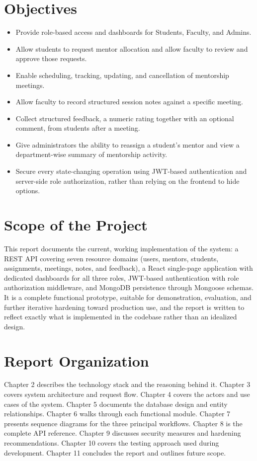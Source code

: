 \documentclass[12pt,a4paper]{report}
\newcommand{\sectionrule}{\vspace{-4pt}{\color{lightgray}\hrule height 1pt}\vspace{8pt}}
\begin{document}
\section{Objectives}
\sectionrule
\begin{itemize}[itemsep=2pt]
  \item Provide role-based access and dashboards for Students, Faculty, and Admins.
  \item Allow students to request mentor allocation and allow faculty to review and approve those requests.
  \item Enable scheduling, tracking, updating, and cancellation of mentorship meetings.
  \item Allow faculty to record structured session notes against a specific meeting.
  \item Collect structured feedback, a numeric rating together with an optional comment, from students after a meeting.
  \item Give administrators the ability to reassign a student's mentor and view a department-wise summary of mentorship activity.
  \item Secure every state-changing operation using JWT-based authentication and server-side role authorization, rather than relying on the frontend to hide options.
\end{itemize}

\section{Scope of the Project}
\sectionrule
This report documents the current, working implementation of the system: a REST API covering seven resource domains (users, mentors, students, assignments, meetings, notes, and feedback), a React single-page application with dedicated dashboards for all three roles, JWT-based authentication with role authorization middleware, and MongoDB persistence through Mongoose schemas. It is a complete functional prototype, suitable for demonstration, evaluation, and further iterative hardening toward production use, and the report is written to reflect exactly what is implemented in the codebase rather than an idealized design.

\section{Report Organization}
\sectionrule
Chapter 2 describes the technology stack and the reasoning behind it. Chapter 3 covers system architecture and request flow. Chapter 4 covers the actors and use cases of the system. Chapter 5 documents the database design and entity relationships. Chapter 6 walks through each functional module. Chapter 7 presents sequence diagrams for the three principal workflows. Chapter 8 is the complete API reference. Chapter 9 discusses security measures and hardening recommendations. Chapter 10 covers the testing approach used during development. Chapter 11 concludes the report and outlines future scope.
\end{document}
